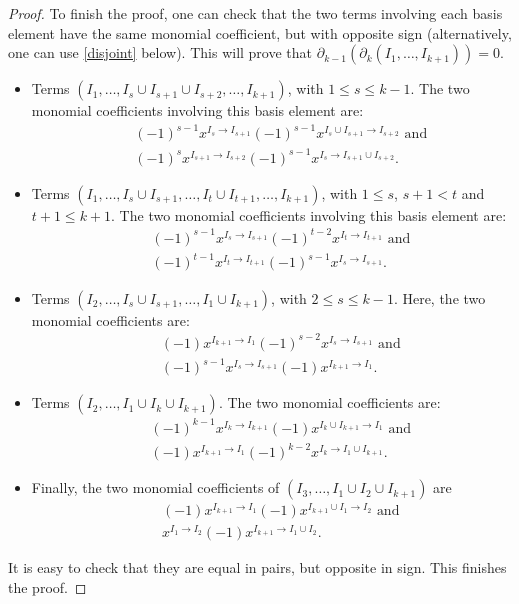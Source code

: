 \documentclass[10pt]{amsart}
\newcommand{\dif}{\mbox{$\partial$}}
\theoremstyle{definition}
\theoremstyle{remark}
\begin{document}
\begin{proof}
To finish the proof, one can check that the two terms involving each
basis element have the same monomial coefficient, but with opposite
sign (alternatively, one can use \eqref{disjoint} below). This will
prove that $\dif_{k-1}(\dif_{k}(I_1,\ldots,I_{k+1}))=0$.
\begin{itemize}
\item Terms $(I_1,\ldots,I_s\cup I_{s+1}\cup I_{s+2},\ldots
  ,I_{k+1})$, with $1\leq s\leq k-1$. The two monomial coefficients
  involving this basis element are:
\begin{eqnarray*}
&& (-1)^{s-1}x^{I_{s}\to I_{s+1}}(-1)^{s-1}x^{I_{s}\cup I_{s+1}\to
    I_{s+2}}\mbox{ and }\\ && (-1)^{s}x^{I_{s+1}\to
    I_{s+2}}(-1)^{s-1}x^{I_{s}\to I_{s+1}\cup I_{s+2}}.
\end{eqnarray*}
\item Terms $(I_1,\ldots,I_s\cup I_{s+1},\ldots ,I_{t}\cup
  I_{t+1},\ldots,I_{k+1})$, with $1\leq s$, $s+1<t$ and $t+1\leq k+1$.
  The two monomial coefficients involving this basis element are:
\begin{eqnarray*}
&& (-1)^{s-1}x^{I_{s}\to I_{s+1}}(-1)^{t-2}x^{I_{t}\to
    I_{t+1}}\mbox{ and }\\ && (-1)^{t-1}x^{I_{t}\to I_{t+1}}(-1)^{s-1}x^{I_{s}\to
    I_{s+1}}.
\end{eqnarray*}
\item Terms $(I_2,\ldots ,I_s\cup I_{s+1},\ldots ,I_1\cup I_{k+1})$,
  with $2\leq s\leq k-1$. Here, the two monomial coefficients are:
\begin{eqnarray*}
&& (-1)x^{I_{k+1}\to I_1}(-1)^{s-2}x^{I_s\to I_{s+1}}\mbox{ and }\\ &&
  (-1)^{s-1}x^{I_s\to I_{s+1}}(-1)x^{I_{k+1}\to I_{1}}.
\end{eqnarray*}
\item Terms $(I_2,\ldots ,I_1\cup I_{k}\cup I_{k+1})$. The two
  monomial coefficients are:
\begin{eqnarray*}
&& (-1)^{k-1}x^{I_k\to I_{k+1}}(-1)x^{I_{k}\cup I_{k+1}\to I_1}\mbox{ and }
\\ && (-1)x^{I_{k+1}\to
    I_1}(-1)^{k-2}x^{I_{k}\to I_1\cup I_{k+1}}. 
\end{eqnarray*}
\item Finally, the two monomial coefficients of $(I_3,\ldots ,I_1\cup
I_2\cup I_{k+1})$ are 
\begin{eqnarray*}
&& (-1)x^{I_{k+1}\to I_1}(-1)x^{I_{k+1}\cup I_1\to I_2}\mbox{ and }\\ && 
x^{I_1\to I_2}(-1)x^{I_{k+1}\to I_1\cup I_2}.
\end{eqnarray*}
\end{itemize}
It is easy to check that they are equal in pairs, but opposite in
sign. This finishes the proof.
\end{proof}
\end{document}
